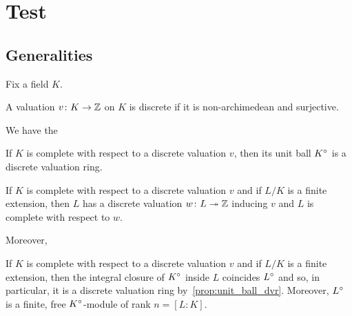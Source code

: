 %

\chapter{Test}

\section{Generalities}
Fix a field $K$.
\begin{definition}
	\label{def:discrete-val}
	\leanok
	A valuation $v\colon K \to \mathbb{Z}$ on $K$ is discrete if it is non-archimedean and surjective.
\end{definition}

We have the

\begin{proposition}
	\label{prop:unit_ball_dvr}
	If $K$ is complete with respect to a discrete valuation $v$, then its unit ball ${K}^\circ$ is a discrete valuation ring.
\end{proposition}

\begin{lemma} 
	\label{lemma:val_L}
	If $K$ is complete with respect to a discrete valuation $v$ and if $L/K$ is a finite extension, then $L$ has a discrete valuation $w\colon L \twoheadrightarrow \mathbb{Z}$ inducing $v$ and $L$ is complete with respect to $w$.
\end{lemma}

Moreover,
\begin{proposition}
	\label{prop:unitball-L}
	If $K$ is complete with respect to a discrete valuation $v$ and if $L/K$ is a finite extension, then the integral closure of ${K}^\circ$ inside $L$ coincides ${L}^\circ$ and so, in particular, it is a discrete valuation ring by~\ref{prop:unit_ball_dvr}. Moreover, ${L}^\circ$ is a finite, free ${K}^\circ$-module of rank $n=[L:K]$.
\end{proposition}
